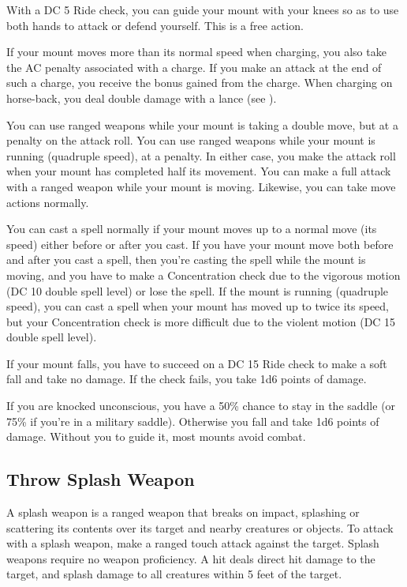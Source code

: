  With a DC 5 Ride check, you can guide your mount with your knees so as to use both hands to attack or defend yourself. This is a free action.

If your mount moves more than its normal speed when charging, you also take the AC penalty associated with a charge. If you make an attack at the end of such a charge, you receive the bonus gained from the charge. When charging on horse-back, you deal double damage with a lance (see ).

You can use ranged weapons while your mount is taking a double move, but at a  penalty on the attack roll. You can use ranged weapons while your mount is running (quadruple speed), at a  penalty. In either case, you make the attack roll when your mount has completed half its movement. You can make a full attack with a ranged weapon while your mount is moving. Likewise, you can take move actions normally.

 You can cast a spell normally if your mount moves up to a normal move (its speed) either before or after you cast. If you have your mount move both before and after you cast a spell, then you're casting the spell while the mount is moving, and you have to make a Concentration check due to the vigorous motion (DC 10 \add double spell level) or lose the spell. If the mount is running (quadruple speed), you can cast a spell when your mount has moved up to twice its speed, but your Concentration check is more difficult due to the violent motion (DC 15 \add double spell level).

 If your mount falls, you have to succeed on a DC 15 Ride check to make a soft fall and take no damage. If the check fails, you take 1d6 points of damage.

 If you are knocked unconscious, you have a 50\% chance to stay in the saddle (or 75\% if you're in a military saddle). Otherwise you fall and take 1d6 points of damage. Without you to guide it, most mounts avoid combat.

\subsection{Throw Splash Weapon}
A splash weapon is a ranged weapon that breaks on impact, splashing or scattering its contents over its target and nearby creatures or objects. To attack with a splash weapon, make a ranged touch attack against the target. Splash weapons require no weapon proficiency. A hit deals direct hit damage to the target, and splash damage to all creatures within 5 feet of the target.

